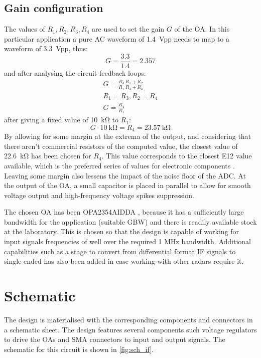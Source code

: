 \subsection{Gain configuration}
The values of $R_1, R_2, R_3, R_4$ are used to set the gain $G$ of the OA.
In this particular application a pure AC waveform of \SI{1.4}{Vpp} needs to map to a waveform of \SI{3.3}{Vpp}, thus:
\begin{equation}
	G = \frac{3.3}{1.4} = 2.357 %
\end{equation}
and after analysing the circuit feedback loops:
\begin{gather}
	G = \frac{R_4}{R_1} \frac{R_1+R_2}{R_3+R_4}\\
	R_1 = R_3, R_2=R_4\\
	G= \frac{R_4}{R_1} %
\end{gather}
after giving a fixed value of \SI{10}{\kilo\ohm} to $R_1$:
\begin{equation}
	G \cdot \SI{10}{\kilo\ohm} = R_4 = \SI{23.57}{\kilo\ohm} %
\end{equation}
By allowing for some margin at the extrema of the output, and considering that there aren't commercial resistors of the computed value, the closest value of \SI{22.6}{\kilo\ohm} has been chosen for $R_4$. This value corresponds to the closest E12 value available, which is the preferred series of values for electronic components \cite{IEC2015}. Leaving some margin also lessens the impact of the noise floor of the ADC.
At the output of the OA, a small capacitor is placed in parallel to allow for smooth voltage output and high-frequency voltage spikes suppression.

The chosen OA has been OPA2354AIDDA \cite{TexasInstruments2014}, because it has a sufficiently large bandwidth for the application (suitable GBW) and there is readily available stock at the laboratory. This is chosen so that the design is capable of working for input signals frequencies of well over the required 1 MHz bandwidth. Additional capabilities such as a stage to convert from differential format IF signals to single-ended has also been added in case working with other radars require it.

\section{Schematic}

The design is materialised with the corresponding components and connectors in a schematic sheet. The design features several components such voltage regulators to drive the OAs and SMA connectors to input and output signals. The schematic for this circuit is shown in \cref{fig:sch_if}.

